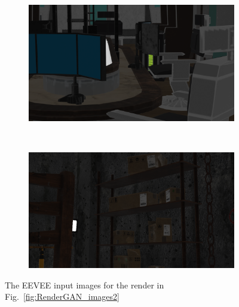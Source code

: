 \begin{figure}[h!]
    \centering
    \begin{subfigure}[b]{0.9\textwidth}
     \includegraphics[width=\textwidth]{figures/result/eevee/s6_camera_60_eevee.png}
     \caption{}
    \end{subfigure}
    \\ \vspace{0.2cm}
    \begin{subfigure}[b]{0.9\textwidth}
     \includegraphics[width=\textwidth]{figures/result/eevee/s3_camera_17_eevee.png}
     \caption{}
    \end{subfigure}
\caption[EEVEE Example of input]{The EEVEE input images for the render in Fig.~\ref{fig:RenderGAN_images2}}
    \label{fig:eevee_images2}
\end{figure}
